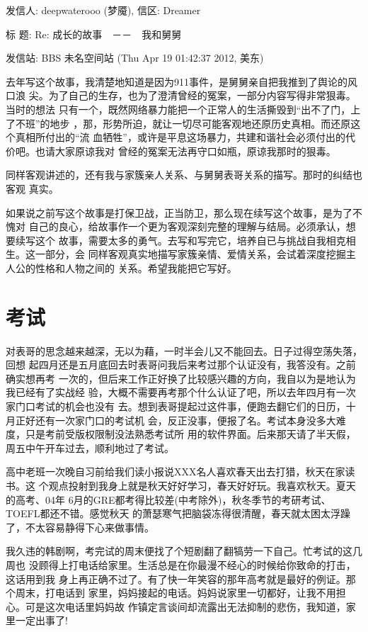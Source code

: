 \documentclass[12pt]{book}
\begin{document}
发信人: deepwaterooo (梦魇), 信区: Dreamer

标  题: Re: 成长的故事　－－　我和舅舅

发信站: BBS 未名空间站 (Thu Apr 19 01:42:37 2012, 美东)

去年写这个故事，我清楚地知道是因为911事件，是舅舅亲自把我推到了舆论的风口浪
尖。为了自己的生存，也为了澄清曾经的冤案，一部分内容写得非常狠毒。当时的想法
只有一个，既然网络暴力能把一个正常人的生活撕毁到“出不了门，上了不班”的地步
，那，形势所迫，就让一切尽可能客观地还原历史真相。而还原这个真相所付出的“流
血牺牲”，或许是平息这场暴力，共建和谐社会必须付出的代价吧。也请大家原谅我对
曾经的冤案无法再守口如瓶，原谅我那时的狠毒。

同样客观讲述的，还有我与家簇亲人关系、与舅舅表哥关系的描写。那时的纠结也客观
真实。

如果说之前写这个故事是打保卫战，正当防卫，那么现在续写这个故事，是为了不愧对
自己的良心，给故事作一个更为客观深刻完整的理解与结局。必须承认，想要续写这个
故事，需要太多的勇气。去写和写完它，培养自已与挑战自我相克相生。这一部分，会
同样客观真实地描写家簇亲情、爱情关系，会试着深度挖掘主人公的性格和人物之间的
关系。希望我能把它写好。
\section{考试}
\label{sec-9-2}

对表哥的思念越来越深，无以为藉，一时半会儿又不能回去。日子过得空荡失落，回想
起四月还是五月底回去时表哥问我后来考过那个认证没有，我答没有。之前确实想再考
一次的，但后来工作正好换了比较感兴趣的方向，我自以为是地认为我已经有了实战经
验，大概不需要再考那个什么认证了吧，所以去年四月有一次家门口考试的机会也没有
去。想到表哥提起过这件事，便跑去翻它们的日历，十月正好还有一次家门口的考试机
会，反正没事，便报了名。考试本身没多大难度，只是考前受版权限制没法熟悉考试所
用的软件界面。后来那天请了半天假，周五中午开车过去，顺利地过了考试。

高中老班一次晚自习前给我们读小报说XXX名人喜欢春天出去打猎，秋天在家读书。这
个观点投射到我身上就是秋天好好学习，春天好好玩。我喜欢秋天。夏天的高考、04年
6月的GRE都考得比较差(中考除外)，秋冬季节的考研考试、TOEFL都还不错。感觉秋天
的萧瑟寒气把脑袋冻得很清醒，春天就太困太浮躁了，不太容易静得下心来做事情。

我久违的韩剧啊，考完试的周末便找了个短剧翻了翻犒劳一下自己。忙考试的这几周也
没顾得上打电话给家里。生活总是在你最漫不经心的时候给你致命的打击，这话用到我
身上再正确不过了。有了快一年笑容的那年高考就是最好的例证。那个周末，打电话到
家里，妈妈接起的电话。妈妈说家里一切都好，让我不用担心。可是这次电话里妈妈故
作镇定言谈间却流露出无法抑制的悲伤，我知道，家里一定出事了!
\end{document}

